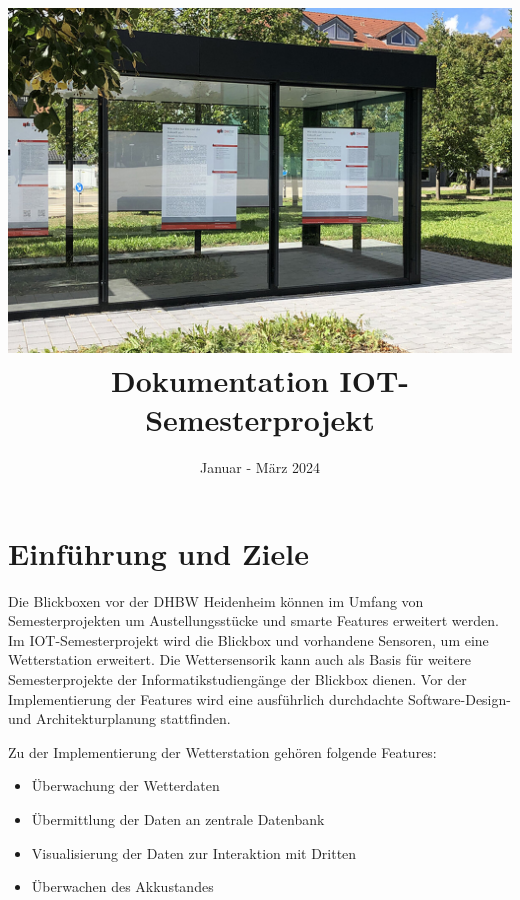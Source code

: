 \documentclass[
]{article}
\title{\includegraphics{header.jpg} Dokumentation IOT-Semesterprojekt}
\author{}
\date{Januar - März 2024}
\begin{document}
\maketitle
\hypertarget{section-introduction-and-goals}{%
\section{Einführung und Ziele}\label{section-introduction-and-goals}}
Die Blickboxen vor der DHBW Heidenheim können im Umfang von Semesterprojekten um Austellungsstücke und smarte Features erweitert werden.
Im IOT-Semesterprojekt wird die Blickbox und vorhandene Sensoren, um eine Wetterstation erweitert.
Die Wettersensorik kann auch als Basis für weitere Semesterprojekte der Informatikstudiengänge der Blickbox dienen.
Vor der Implementierung der Features wird eine ausführlich durchdachte Software-Design- und Architekturplanung stattfinden.

Zu der Implementierung der Wetterstation gehören folgende Features:
\begin{itemize}
  \item Überwachung der Wetterdaten
  \item Übermittlung der Daten an zentrale Datenbank
  \item Visualisierung der Daten zur Interaktion mit Dritten
  \item Überwachen des Akkustandes
\end{itemize}
\end{document}

